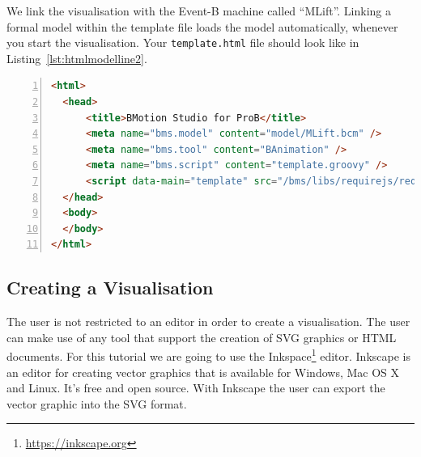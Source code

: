 We link the visualisation with the Event-B machine called ``MLift''.
Linking a formal model within the template file loads the model automatically, whenever you start the visualisation.
Your \texttt{template.html} file should look like in Listing~\ref{lst:htmlmodelline2}.

\begin{lstlisting}[float=ht,language=html, numbers=left,                   numbersep=5pt,            
  numberstyle=\tiny\color{gray},caption={Template HTML file after linking the Event-B model with the visualisation},label=lst:htmlmodelline2]
<html>
  <head>
      <title>BMotion Studio for ProB</title>
      <meta name="bms.model" content="model/MLift.bcm" />
      <meta name="bms.tool" content="BAnimation" />
      <meta name="bms.script" content="template.groovy" />
      <script data-main="template" src="/bms/libs/requirejs/require.js"></script>
  </head>
  <body>
  </body>
</html>
\end{lstlisting}


\subsection{Creating a Visualisation}

The user is not restricted to an editor in order to create a visualisation.
The user can make use of any tool that support the creation of SVG graphics or HTML documents.
For this tutorial we are going to use the Inkspace\footnote{\url{https://inkscape.org}} editor. Inkscape is an editor for creating vector graphics that is available for Windows, Mac OS X and Linux.
It's free and open source.
With Inkscape the user can export the vector graphic into the SVG format.


